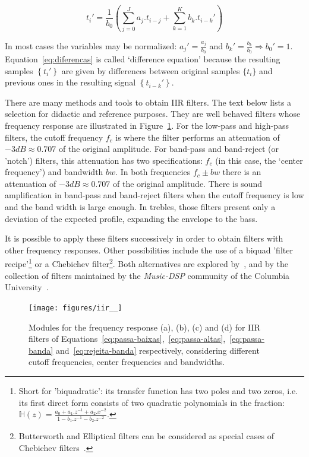 \begin{equation}\label{eq:diferencas}
 t_i' = \frac{1}{b_0}\left ( \sum_{j=0}^Ja_j . t_{i-j} + \sum_{k=1}^Kb_k . t_{i-k}' \right )
\end{equation}

In most cases the variables may be normalized: $a_j'=\frac{a_j}{b_0}$ and $b_k'=\frac{b_k}{b_0} \Rightarrow b_0' = 1$.
Equation~\ref{eq:diferencas} is called `difference equation' because the resulting samples $\left\{t_i'\right\}$ are given by differences between original samples $\{t_i\}$ and previous ones in the resulting signal $\left\{t_{i-k}'\right\}$.

There are many methods and tools to obtain IIR filters. The text below lists a selection for didactic and reference purposes.
They are well behaved filters whose frequency response are illustrated in Figure~\ref{fig:iir}.
For the low-pass and high-pass filters, the cutoff frequency $f_c$ is where the filter performs an attenuation of $-3dB \approx 0.707 $ of the original amplitude.
For band-pass and band-reject (or 'notch') filters, this attenuation has two specifications: $f_c$ (in this case, the `center frequency') and bandwidth $bw$. In both frequencies $f_c \pm bw$ there is an attenuation of $-3dB \approx 0.707$ of the original amplitude.
There is sound amplification in band-pass and band-reject filters when the cutoff frequency is low and the band width is large enough. In trebles, those filters present only a deviation of the expected profile, expanding the envelope to the bass.

It is possible to apply these filters successively in order to obtain filters with other frequency responses.
Other possibilities include the use of a biquad 'filter recipe'\footnote{Short 
for 'biquadratic': its transfer function has two poles and two zeros, i.e. its first direct form consists of two quadratic polynomials in the fraction: $\mathbb{H}(z)=\frac{a_0+a_1.z^{-1}+a_2.x^{-2}}{1- b_1.z^{-1} -b_2 . z^{-2}}$.}
or a Chebichev filter\footnote{Butterworth and Elliptical filters can be considered as special cases of Chebichev filters~\cite{Openheim,smith}.}.
Both alternatives are explored by~\cite{JOSFM,smith}, and by the collection of filters maintained by the \emph{Music-DSP} community of the Columbia University~\cite{music-dsp,Openheim}.

\begin{figure}
    \centering
        \texttt{[image: figures/iir\_\_]}
    \caption{Modules for the frequency response (a), (b), (c) and (d) for IIR filters of Equations~\ref{eq:passa-baixas},~\ref{eq:passa-altas},~\ref{eq:passa-banda} and~\ref{eq:rejeita-banda} respectively, considering different cutoff frequencies, center frequencies and bandwidths.}
        \label{fig:iir}
\end{figure}

